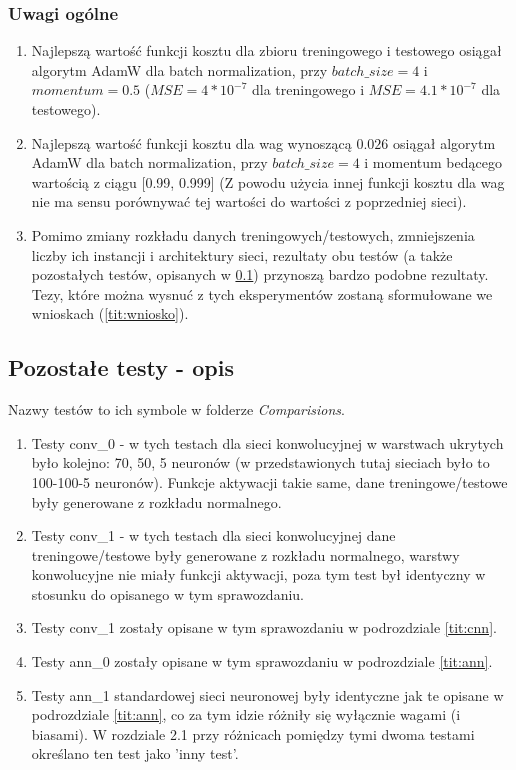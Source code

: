 \documentclass[12pt]{article}
\begin{document}
\subsubsection{Uwagi ogólne}
\begin{enumerate}
	\item Najlepszą wartość funkcji kosztu dla zbioru treningowego i testowego osiągał algorytm AdamW dla batch normalization, przy $batch\_size=4$ i $momentum=0.5$ ($MSE=4*10^{-7}$ dla treningowego i $MSE=4.1*10^{-7}$ dla testowego).
	\item Najlepszą wartość funkcji kosztu dla wag wynoszącą $0.026$ osiągał algorytm AdamW dla batch normalization, przy $batch\_size=4$ i momentum bedącego wartością z ciągu [0.99, 0.999] (Z powodu użycia innej funkcji kosztu dla wag nie ma sensu porównywać tej wartości do wartości z poprzedniej sieci).
	\item Pomimo zmiany rozkładu danych treningowych/testowych, zmniejszenia liczby ich instancji i architektury sieci, rezultaty obu testów (a także pozostałych testów, opisanych w \ref{tit:testo}) przynoszą bardzo podobne rezultaty. Tezy, które można wysnuć z tych eksperymentów zostaną sformułowane we wnioskach (\ref{tit:wniosko}).
\end{enumerate}



\subsection{Pozostałe testy - opis}\label{tit:testo}
Nazwy testów to ich symbole w folderze \textit{Comparisions}.
\begin{enumerate}
	\item Testy conv\_0 - w tych testach dla sieci konwolucyjnej w warstwach ukrytych było kolejno: 70, 50, 5 neuronów (w przedstawionych tutaj sieciach było to 100-100-5 neuronów). Funkcje aktywacji takie same, dane treningowe/testowe były generowane z rozkładu normalnego.
	\item Testy conv\_1 - w tych testach dla sieci konwolucyjnej dane treningowe/testowe były generowane z rozkładu normalnego, warstwy konwolucyjne nie miały funkcji aktywacji, poza tym test był identyczny w stosunku do opisanego w tym sprawozdaniu.
	\item Testy conv\_1 zostały opisane w tym sprawozdaniu w podrozdziale \ref{tit:cnn}.
	\item Testy ann\_0 zostały opisane w tym sprawozdaniu w podrozdziale \ref{tit:ann}.
	\item Testy ann\_1 standardowej sieci neuronowej były identyczne jak te opisane w podrozdziale \ref{tit:ann}, co za tym idzie różniły się wyłącznie wagami (i biasami). W rozdziale 2.1 przy różnicach pomiędzy tymi dwoma testami określano ten test jako 'inny test'.
\end{enumerate}
\end{document}

